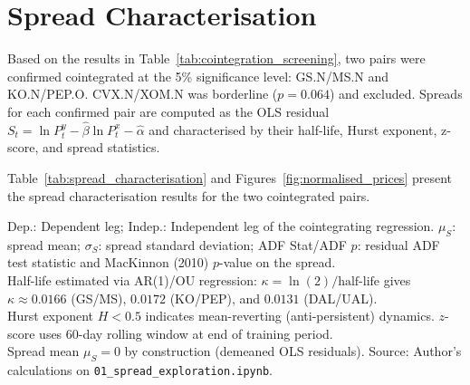 \documentclass[a4paper]{report}
\begin{document}
\section{Spread Characterisation}

Based on the results in Table~\ref{tab:cointegration_screening}, two pairs were confirmed cointegrated at the 5\% significance level: GS.N/MS.N and KO.N/PEP.O. CVX.N/XOM.N was borderline ($p = 0.064$) and excluded. Spreads for each confirmed pair are computed as the OLS residual $S_t = \ln P^y_t - \hat{\beta}\ln P^x_t - \hat{\alpha}$ and characterised by their half-life, Hurst exponent, z-score, and spread statistics.

Table~\ref{tab:spread_characterisation} and Figures~\ref{fig:normalised_prices}
present the spread characterisation results for the two cointegrated pairs.

\begin{table}[htbp]
\centering
\caption{Spread Characterisation Summary --- Cointegrated Pairs (In-Sample: Jan 2019 -- Dec 2023)}
\label{tab:spread_characterisation}
\par\smallskip
\begin{minipage}{\textwidth}
\small
Dep.: Dependent leg; Indep.: Independent leg of the cointegrating regression. 
$\mu_S$: spread mean; $\sigma_S$: spread standard deviation; ADF Stat/ADF $p$: residual ADF test statistic and MacKinnon (2010) $p$-value on the spread.\\
Half-life estimated via AR(1)/OU regression: $\kappa = \ln(2)/\text{half-life}$ gives $\kappa \approx 0.0166$ (GS/MS), $0.0172$ (KO/PEP), and $0.0131$ (DAL/UAL).\\
Hurst exponent $H < 0.5$ indicates mean-reverting (anti-persistent) dynamics. $z$-score uses 60-day rolling window at end of training period.\\
Spread mean $\mu_S = 0$ by construction (demeaned OLS residuals). Source: Author's calculations on \texttt{01\_spread\_exploration.ipynb}.
\end{minipage}

\end{table}
\end{document}
